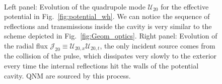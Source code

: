 \documentclass[article,aps,nofootinbib,twocolumn,superscriptaddress]{revtex4-1}
\begin{document}
\begin{figure}
\centering
{} \,
\caption{\label{fig:sol_n_flux_wh} Left panel: Evolution of the quadrupole mode $\mathcal{U}_{20}$ for the effective potential in Fig.~\ref{fig:potential_wh}. We can notice the sequence of reflections and transmissions inside the cavity is very similar to the scheme depicted in Fig.~\ref{fig:Geom_optics}. Right panel: Evolution of the radial flux $\mathcal{J}_{20}\equiv \mathcal{U}_{20,x} \mathcal{U}_{20,t}$, the only incident source comes from the collision of the pulse, which dissipates very slowly to the exterior every time the internal reflections hit the walls of the potential cavity. QNM are sourced by this process.} 
\end{figure}
\end{document}
